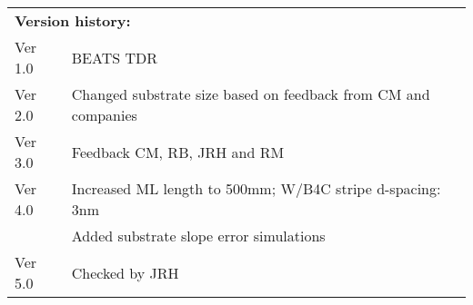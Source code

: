 \begin{center}
\begin{tabular}[bhp]{|p{} p{}|}
\hline
\multicolumn{2}{|l|}{\textbf{Version history:}} \\
\multicolumn{1}{|l}{Ver 1.0}  & \multicolumn{1}{l|}{BEATS TDR}  \\
\multicolumn{1}{|l}{Ver 2.0}  & \multicolumn{1}{l|}{Changed substrate size based on feedback from CM and companies}  \\
\multicolumn{1}{|l}{Ver 3.0}  & \multicolumn{1}{l|}{Feedback CM, RB, JRH and RM}  \\
\multicolumn{1}{|l}{Ver 4.0}  & \multicolumn{1}{l|}{Increased ML length to 500mm; W/B4C stripe d-spacing: 3nm}  \\
\multicolumn{1}{|l}{}  & \multicolumn{1}{l|}{Added substrate slope error simulations}  \\
\multicolumn{1}{|l}{Ver 5.0}  & \multicolumn{1}{l|}{Checked by JRH}  \\
\hline
\end{tabular}
\end{center}